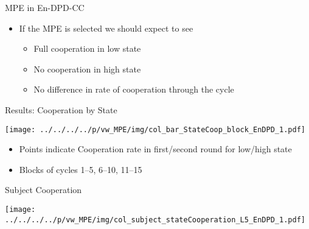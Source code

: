 \documentclass{beamer}
\begin{document}
\begin{frame}{MPE in En-DPD-CC}

\begin{itemize}\item If the MPE is selected we should expect to see
		\begin{itemize}
			\item Full cooperation in low state
			\item No cooperation in high state
			\item No difference in rate of cooperation through the cycle
		\end{itemize}
\end{itemize}
\end{frame}

\begin{frame}{Results: Cooperation by State}

\begin{center}
	\texttt{[image: ../../../../p/vw\_MPE/img/col\_bar\_StateCoop\_block\_EnDPD\_1.pdf]}
\end{center}

{\small \begin{itemize}\item Points indicate Cooperation rate in first/second round for low/high state
\item Blocks of cycles 1--5, 6--10, 11--15
\end{itemize}
}\end{frame}
\begin{frame}{Subject Cooperation }


\begin{center}
	\texttt{[image: ../../../../p/vw\_MPE/img/col\_subject\_stateCooperation\_L5\_EnDPD\_1.pdf]}
\end{center}

\end{frame}
\end{document}

